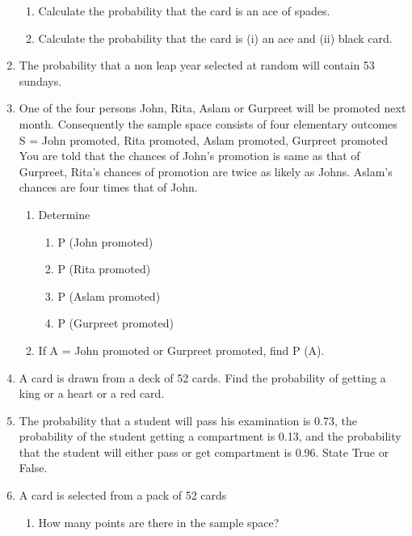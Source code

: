 \begin{enumerate}[label=\thesection.\arabic*,ref=\thesection.\theenumi]
\begin{enumerate}[label=(\alph*)]
    \item Calculate the probability that the card is an ace of spades.
    \item Calculate the probability that the card is (i) an ace and (ii) black card.
\end{enumerate}
\solution

\item The probability that a non leap year selected at random will contain 53 sundays.
\\
\solution

\item One of the four persons John, Rita, Aslam or Gurpreet will be promoted next
month. Consequently the sample space consists of four elementary outcomes
S = {John promoted, Rita promoted, Aslam promoted, Gurpreet promoted}
You are told that the chances of John’s promotion is same as that of Gurpreet,
Rita’s chances of promotion are twice as likely as Johns. Aslam’s chances are
four times that of John.
\begin{enumerate}
	\item Determine
	\begin{enumerate}
		\item P (John promoted)
		\item P (Rita promoted)
		\item P (Aslam promoted)
		\item P (Gurpreet promoted)
	\end{enumerate}
	\item If A = {John promoted or Gurpreet promoted}, find P (A).
\end{enumerate}
\solution

\item A card is drawn from a deck of 52 cards. Find the probability of getting a king or a heart or a red card.\\
\solution

\item The probability that a student will pass his examination is 0.73, the probability of
the student getting a compartment is 0.13, and the probability that the student will
either pass or get compartment is 0.96. State True or False.\\
\solution

\item A card is selected from a pack of 52 cards\\
\begin{enumerate}[label=(\alph*)]
\item How many points are there in the sample space?

\end{enumerate}
\end{enumerate}

